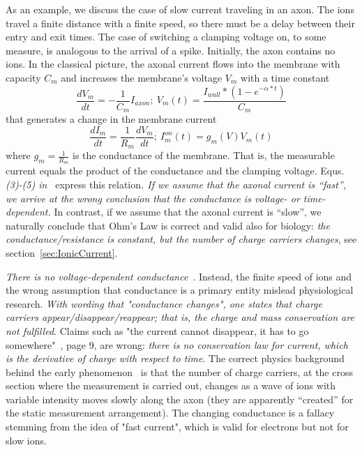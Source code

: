 \ifx\magyar\undefined
As an example, we discuss the case of slow current
traveling in an axon.
The ions travel a finite distance with
a finite speed, so there must be a delay between their entry and exit times. The case of switching a clamping voltage
on, to some measure, is analogous to the arrival of a spike. Initially, the axon contains
no ions. 
In the classical picture, the axonal current flows into the membrane with
capacity $C_{m}$ and increases the membrane's voltage $V_{m}$
with a time constant 
\begin{equation}
	\frac{dV_{m}}{dt}=-\frac{1}{C_{m}}I_{axon};\ V_{m}(t)=\frac{I_{wall}*(1-e^{-\alpha*t})}{C_{m}}\label{eq:MembraneCurrent}
\end{equation}
%
\noindent that generates a change in the membrane current
\begin{equation}
	\frac{dI_{m}}{dt}=\frac{1}{R_{m}}\frac{dV_{m}}{dt};\ I_{m}^{on}(t)=g_{m}(V)V_{m}(t)\label{eq:TimeDependentConductance}
\end{equation}
\noindent where $g_{m}=\frac{1}{R_{m}}$ is the conductance of the
membrane. That is, the measurable current equals the product of the conductance
and the clamping voltage. Equs.\emph{(3)-(5) in~\cite{HodgkinHuxley:1952}}
express this relation\emph{. If we assume that the axonal current
	is ``fast'', we arrive at the wrong conclusion that the conductance
	is voltage- or time-dependent.}
In contrast, if we assume that the axonal current is ``slow'',
we naturally conclude that Ohm's Law is correct and valid also for
biology: \textit{the conductance/resistance is constant, but the number of charge carriers changes}, see section~\ref{sec:IonicCurrent}.
\else

\fi


\ifx\magyar\undefined
\emph{There is no voltage-dependent conductance}~\cite{KochVoltageDependentConductance:1999}.
Instead, the finite speed of ions and the wrong assumption that conductance
is a primary entity mislead physiological research.\emph{ With wording
	that "conductance changes", one states that charge carriers
	appear/disappear/reappear; that is, the charge and mass conservation are not
	fulfilled}. Claims such as "the current cannot disappear, it has to go somewhere"~\cite{KochBiophysics:1999}, page 9, are wrong: \textit{there is no conservation law for current, which is the derivative of charge with respect to time}. 
The correct physics background behind the early phenomenon~\cite{COLE_CURTIS_IMPEDANCE:1939} is that the number of charge carriers, at the cross section where the measurement is carried out, changes as a wave of ions with variable intensity moves slowly along the axon (they are apparently ``created'' for the static measurement arrangement). The changing conductance is a fallacy stemming from the idea of "fast current", which is valid for electrons but not for slow ions. 


